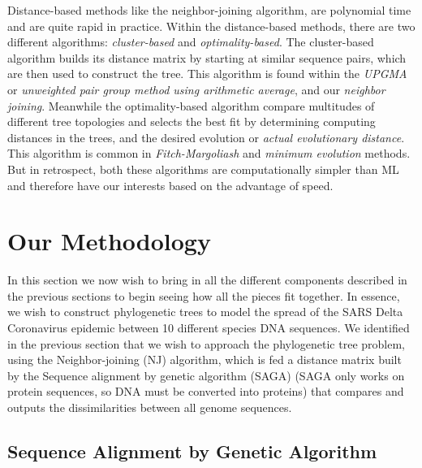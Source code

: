 Distance-based methods like the neighbor-joining algorithm, are polynomial time and are quite rapid in practice. Within the distance-based methods, there are two different algorithms: \emph{cluster-based} and \emph{optimality-based}. The cluster-based algorithm builds its distance matrix by starting at similar sequence pairs, which are then used to construct the tree. This algorithm is found within the \emph{UPGMA} or \emph{unweighted pair group method using arithmetic average}, and our \emph{neighbor joining}. Meanwhile the optimality-based algorithm compare multitudes of different tree topologies and selects the best fit by determining computing distances in the trees, and the desired evolution or \emph{actual evolutionary distance}. This algorithm is common in \emph{Fitch-Margoliash} and \emph{minimum evolution} methods. But in retrospect, both these algorithms are computationally simpler than ML and therefore have our interests based on the advantage of speed.  

\section{Our Methodology}

In this section we now wish to bring in all the different components described in the previous sections to begin seeing how all the pieces fit together. In essence, we wish to construct phylogenetic trees to model the spread of the SARS Delta Coronavirus epidemic between 10 different species DNA sequences. We identified in the previous section that we wish to approach the phylogenetic tree problem, using the Neighbor-joining (NJ) algorithm, which is fed a distance matrix built by the Sequence alignment by genetic algorithm (SAGA) (SAGA only works on protein sequences, so DNA must be converted into proteins) that compares and outputs the dissimilarities between all genome sequences.  

\subsection{Sequence Alignment by Genetic Algorithm}


